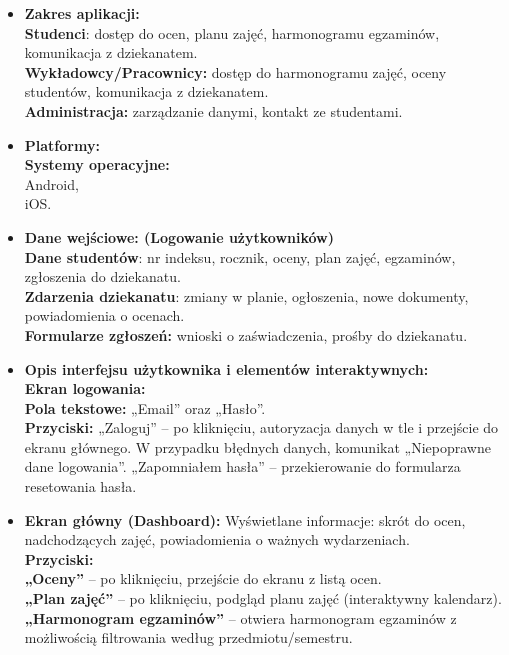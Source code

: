 \begin{itemize}
      \item \textbf{Zakres aplikacji:}
            \\\textbf{Studenci}: dostęp do ocen, planu zajęć, harmonogramu egzaminów, komunikacja z dziekanatem.
            \\\textbf{Wykładowcy/Pracownicy:} dostęp do harmonogramu zajęć, oceny studentów, komunikacja z dziekanatem.
            \\\textbf{Administracja: }zarządzanie danymi, kontakt ze studentami.
      \item \textbf{Platformy:}
            \\\textbf{Systemy operacyjne:} \\Android, \\iOS.
            \newpage
      \item \textbf{Dane wejściowe: (Logowanie użytkowników)}
            \\\textbf{Dane studentów}: nr indeksu, rocznik, oceny, plan zajęć, egzaminów, zgłoszenia do dziekanatu.
            \\\textbf{Zdarzenia dziekanatu}: zmiany w planie, ogłoszenia, nowe dokumenty, powiadomienia o ocenach.
            \\\textbf{Formularze zgłoszeń:} wnioski o zaświadczenia, prośby do dziekanatu.
      \item \textbf{Opis interfejsu użytkownika i elementów interaktywnych:}
            \\\textbf{Ekran logowania:}
            \\\textbf{Pola tekstowe:} „Email” oraz „Hasło”.
            \\\textbf{Przyciski:} „Zaloguj” – po kliknięciu, autoryzacja danych w tle i przejście do ekranu głównego. W przypadku błędnych danych, komunikat „Niepoprawne dane logowania”. „Zapomniałem hasła” – przekierowanie do formularza resetowania hasła.
      \item  \textbf{Ekran główny (Dashboard):}
            Wyświetlane informacje: skrót do ocen, nadchodzących zajęć, powiadomienia o ważnych wydarzeniach.
            \\\textbf{Przyciski:}
            \\\textbf{„Oceny”} – po kliknięciu, przejście do ekranu z listą ocen.
            \\\textbf{„Plan zajęć”} – po kliknięciu, podgląd planu zajęć (interaktywny kalendarz).
            \\\textbf{„Harmonogram egzaminów”} – otwiera harmonogram egzaminów z możliwością filtrowania według przedmiotu/semestru.

\end{itemize}
